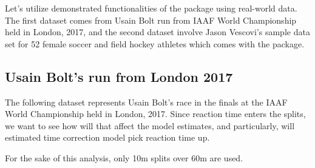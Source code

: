 \documentclass[
]{jss}
\begin{document}
Let's utilize demonstrated functionalities of the  package using real-world data. The first dataset comes from Usain Bolt run from IAAF World Championship held in London, 2017, and the second dataset involve Jason Vescovi's sample data set for 52 female soccer and field hockey athletes which comes with the  package.

\hypertarget{usain-bolts-run-from-london-2017}{%
\subsection{Usain Bolt's run from London 2017}\label{usain-bolts-run-from-london-2017}}

The following dataset represents Usain Bolt's race in the finals at the IAAF World Championship held in London, 2017. Since reaction time enters the splits, we want to see how will that affect the model estimates, and particularly, will estimated time correction model pick reaction time up.

For the sake of this analysis, only 10m splits over 60m are used.
\end{document}
